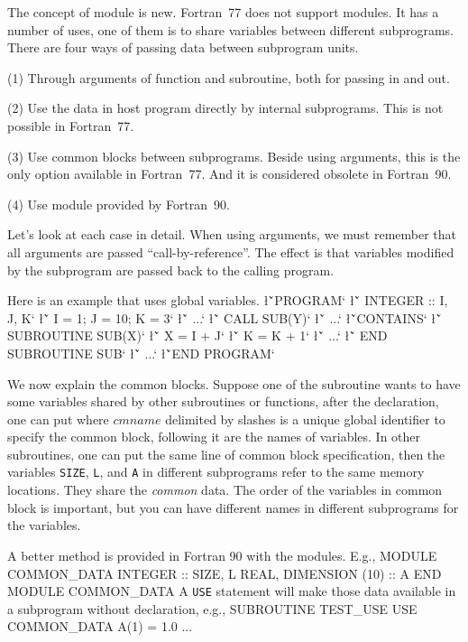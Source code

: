 {{The concept of module is new.  Fortran~77 does not support modules.
It has a number of uses, one of them is to share variables between
different subprograms.  There are four ways of passing data between
subprogram units.  

(1) Through arguments of function and subroutine, both for passing in and out.

(2) Use the data in host program directly by internal subprograms.
This is not possible in Fortran~77.

(3) Use common blocks between subprograms.  Beside using arguments, this 
is the only option available in Fortran~77.  And it is considered obsolete in
Fortran~90. 

(4) Use module provided by Fortran~90.

Let's look at each case in detail.  When using arguments,
we must remember that all arguments are passed ``call-by-reference''.
The effect is that variables modified by the subprogram are
passed back to the calling program.  

Here is an example that uses global variables.
\sms
\l{\v`PROGRAM`\m{}}
\l{\v`   INTEGER :: I, J, K`}
\l{\v`   I = 1; J = 10; K = 3`\m{}}
\l{\v`   ...`\m{}}
\l{\v`   CALL SUB(Y)`\m{}}
\l{\v`   ...`\m{}}
\l{\v`CONTAINS`}
\l{\v`   SUBROUTINE SUB(X)`\m{}}
\l{\v`      X = I + J`}
\l{\v`      K = K + 1`\m{}}
\l{\v`      ...`\m{}}
\l{\v`   END SUBROUTINE SUB`\m{}}
\l{\v`   ...`\m{}}
\l{\v`END PROGRAM`\m{}}
\sms

We now explain the common blocks. Suppose one of the
subroutine wants to have some variables shared by other subroutines
or functions, after the declaration, one can put
\sms
{}
\sms
where $cmname$ delimited by slashes is a unique global identifier to 
specify the common block, following it are the names of variables.
In other subroutines, one can put the same line of common block
specification, then the variables {\tt SIZE}, {\tt L}, and {\tt A} 
in different subprograms refer to the same memory locations.  They
share the {\sl common} data.  The order of the variables 
in common block is important,
but you can have different names in different subprograms for the
variables. 

A better method is provided in Fortran 90 with the modules.  E.g.,
\ttbg
MODULE COMMON_DATA
   INTEGER :: SIZE, L
   REAL, DIMENSION (10) :: A
END MODULE COMMON_DATA
\tted
A {\tt USE} statement will make those data available in a subprogram
without declaration, e.g.,
\ttbg
SUBROUTINE TEST_USE
   USE COMMON_DATA
   A(1) = 1.0
   ...
\tted
\sms

}}

